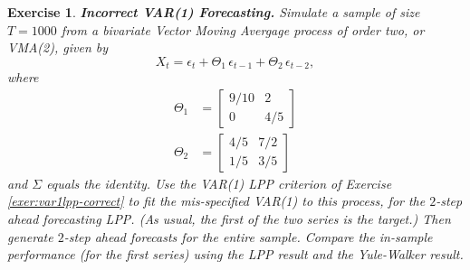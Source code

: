 \documentclass[a4paper]{book}
\newtheorem{Exercise}{Exercise}
\begin{document}
\begin{Exercise} {\bf Incorrect VAR(1) Forecasting.} \rm
\label{exer:var1lpp-incorrect.fore}
 Simulate a sample of size $T=1000$ from
 a bivariate Vector Moving Avergage process of order two, or VMA(2), given by
\[
  X_t = \epsilon_t + \Theta_1 \, \epsilon_{t-1} + \Theta_2 \, \epsilon_{t-2},
\]
  where
\begin{align*}
 \Theta_1 & = \left[ \begin{array}{cc} 9/10 & 2 \\ 0 & 4/5 \end{array} \right] \\
 \Theta_2 & = \left[ \begin{array}{cc} 4/5 & 7/2 \\ 1/5 & 3/5 \end{array} \right] 
\end{align*}
  and $\Sigma$ equals the identity.  Use the VAR(1) LPP criterion of   
 Exercise \ref{exer:var1lpp-correct}  to 
 fit the mis-specified VAR(1) to this process, for   the $2$-step ahead forecasting
 LPP.  (As usual, the first of the two series is the target.)
 Then generate $2$-step ahead forecasts for the entire sample.  Compare the in-sample 
 performance  (for the first series) using the LPP result and the Yule-Walker result.
\end{Exercise}
\end{document}
